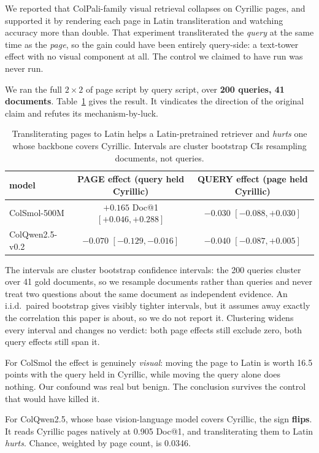 \documentclass{article}
\begin{document}
We reported that ColPali-family visual retrieval \cite{faysse2025colpali} collapses on Cyrillic pages, and supported it by rendering each page in Latin transliteration and watching accuracy more than double. That experiment transliterated the \emph{query} at the same time as the \emph{page}, so the gain could have been entirely query-side: a text-tower effect with no visual component at all. The control we claimed to have run was never run.

We ran the full $2 \times 2$ of page script by query script, over \textbf{200 queries, 41 documents}. Table~\ref{tab:visual} gives the result. It vindicates the direction of the original claim and refutes its mechanism-by-luck.

\begin{table}
\centering
\begin{tabular}{lcc}
\toprule
\textbf{model} & \textbf{PAGE effect} (query held Cyrillic) & \textbf{QUERY effect} (page held Cyrillic) \\
\midrule
ColSmol-500M     & $\mathbf{+0.165}$ Doc@1 $[+0.046, +0.288]$ & $-0.030$ $[-0.088, +0.030]$ \\
ColQwen2.5-v0.2  & $\mathbf{-0.070}$ $[-0.129, -0.016]$ & $-0.040$ $[-0.087, +0.005]$ \\
\bottomrule
\end{tabular}
\caption{Transliterating pages to Latin helps a Latin-pretrained retriever and \emph{hurts} one whose backbone covers Cyrillic. Intervals are cluster bootstrap CIs resampling documents, not queries.}
\label{tab:visual}
\end{table}

The intervals are cluster bootstrap confidence intervals: the 200 queries cluster over 41 gold documents, so we resample documents rather than queries and never treat two questions about the same document as independent evidence. An i.i.d.\ paired bootstrap gives visibly tighter intervals, but it assumes away exactly the correlation this paper is about, so we do not report it. Clustering widens every interval and changes no verdict: both page effects still exclude zero, both query effects still span it.

For ColSmol the effect is genuinely \emph{visual}: moving the page to Latin is worth 16.5 points with the query held in Cyrillic, while moving the query alone does nothing. Our confound was real but benign. The conclusion survives the control that would have killed it.

For ColQwen2.5, whose base vision-language model covers Cyrillic, the sign \textbf{flips}. It reads Cyrillic pages natively at 0.905 Doc@1, and transliterating them to Latin \emph{hurts}. Chance, weighted by page count, is 0.0346.
\end{document}
